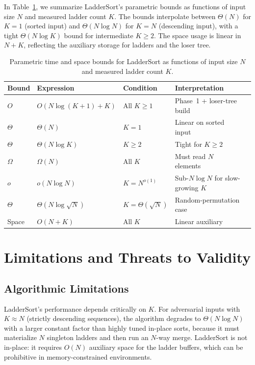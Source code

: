 \documentclass{ieeeaccess}
\theoremstyle{plain}
\theoremstyle{definition}
\begin{document}
In Table~\ref{tab:parametric-bounds}, we summarize LadderSort's parametric bounds as functions of input size $N$ and measured ladder count $K$.  The bounds interpolate between $\Theta(N)$ for $K=1$ (sorted input) and $\Theta(N\log N)$ for $K=N$ (descending input), with a tight $\Theta(N\log K)$ bound for intermediate $K \ge 2$.  The space usage is linear in $N + K$, reflecting the auxiliary storage for ladders and the loser tree.

\begin{table}[t]
\centering\small
\caption{Parametric time and space bounds for LadderSort as functions of
  input size $N$ and measured ladder count $K$.}
\label{tab:parametric-bounds}
\begin{tabularx}{\linewidth}{@{}llllX@{}}
\toprule
Bound & Expression & Condition & Interpretation \\
\midrule
$O$        & $O(N\log(K+1) + K)$ & All $K \ge 1$       & Phase~1 + loser-tree build \\
$\Theta$   & $\Theta(N)$              & $K = 1$             & Linear on sorted input \\
$\Theta$   & $\Theta(N\log K)$        & $K \ge 2$           & Tight for $K \ge 2$ \\
$\Omega$   & $\Omega(N)$              & All $K$             & Must read $N$ elements \\
$o$        & $o(N\log N)$             & $K = N^{o(1)}$      & Sub-$N\log N$ for slow-growing $K$ \\
$\Theta$   & $\Theta(N\log\sqrt{N})$  & $K=\Theta(\sqrt{N})$& Random-permutation case \\
Space      & $O(N + K)$               & All $K$             & Linear auxiliary \\
\bottomrule
\end{tabularx}
\end{table}

\section{Limitations and Threats to Validity}
\label{sec:limits}

\subsection{Algorithmic Limitations}

LadderSort's performance depends critically on $K$.  For adversarial inputs with $K \approx N$ (strictly descending sequences), the algorithm degrades to $\Theta(N\log N)$ with a larger constant factor than highly tuned in-place sorts, because it must materialize $N$ singleton ladders and then run an $N$-way merge.  LadderSort is not in-place: it requires $O(N)$ auxiliary space for the ladder buffers, which can be prohibitive in memory-constrained environments.
\end{document}
